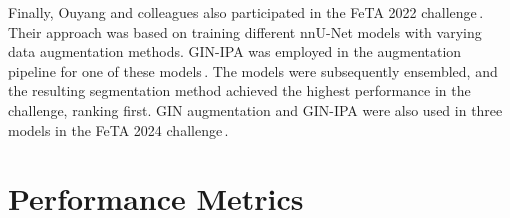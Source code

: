 Finally, Ouyang and colleagues also participated in the FeTA 2022 challenge\,\cite{FeTA2022_review}. Their approach was based on training different nnU-Net models with varying data augmentation methods. GIN-IPA was employed in the augmentation pipeline for one of these models\,\cite{FeTA2022_top}. The models were subsequently ensembled, and the resulting segmentation method achieved the highest performance in the challenge, ranking first. GIN augmentation and GIN-IPA were also used in three models in the FeTA 2024 challenge\,\cite{FeTA2024_review}.

\section{Performance Metrics}
